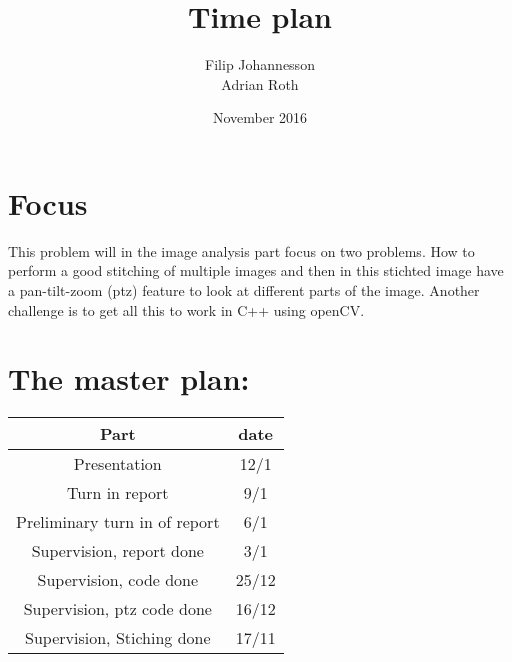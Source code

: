 \documentclass{article}
\title{Time plan}
\author{Filip Johannesson\\ Adrian Roth}
\date{November 2016}
\begin{document}
\maketitle

\section*{Focus}
This problem will in the image analysis part focus on two problems. How to perform a good stitching of multiple images and then in this stichted image have a pan-tilt-zoom (ptz) feature to look at different parts of the image. Another challenge is to get all this to work in C++ using openCV.

\section*{The master plan:}

\begin{center}
  \begin{tabular}{c||c}
  Part &  date\\ \hline
  Presentation & 12/1 \\
  Turn in report & 9/1 \\
  Preliminary turn in of report & 6/1 \\
  Supervision, report done & 3/1 \\
  Supervision, code done & 25/12 \\
  Supervision, ptz code done & 16/12 \\
  Supervision, Stiching done & 17/11
  \end{tabular}
\end{center}
\end{document}
